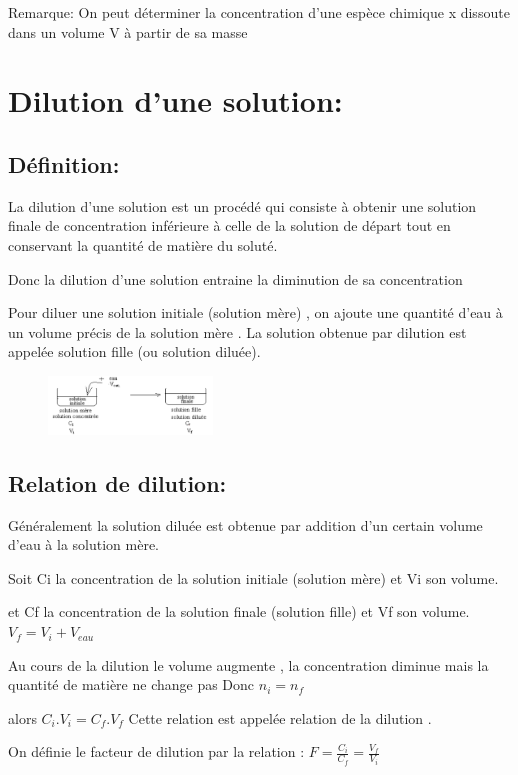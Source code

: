 \documentclass[12pt]{article}
\begin{document}
Remarque: On peut déterminer la concentration d'une espèce chimique x dissoute dans un volume V à partir de
sa masse
\section{Dilution d'une solution: }
\subsection{Définition: }
La dilution d'une solution est un procédé qui consiste à obtenir une solution finale de concentration inférieure à
celle de la solution de départ tout en conservant la quantité de matière du soluté.

Donc la dilution d'une solution entraine la diminution de sa concentration

Pour diluer une solution initiale (solution mère) , on ajoute une quantité d'eau à un volume précis de la solution
mère . La solution obtenue par dilution est appelée solution fille (ou solution diluée).
\begin{figure}
  \begin{center}
    \includegraphics[width=0.39\textwidth]{./img/dilution_fig00.png}
  \end{center}
\end{figure}
\subsection{Relation de dilution:}
Généralement la solution diluée est obtenue par addition d'un certain volume d'eau à la solution mère.

Soit Ci la concentration de la solution initiale (solution mère) et Vi son volume. 

et Cf la concentration de la solution finale (solution fille) et Vf son volume. $V_f = V_i + V_{eau}$

Au cours de la dilution le volume augmente , la concentration diminue mais  la quantité de matière ne change pas Donc $n_i = n_f$

alors $C_i.V_i = C_f.V_f$ Cette relation est appelée relation de la dilution .

On définie le facteur de dilution par la relation : $F = \frac{C_i}{C_f} =\frac{V_f}{V_i}$
\end{document}
